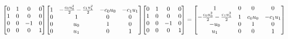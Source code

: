 \documentclass[11pt]{article}
\theoremstyle{definition}
\begin{document}
\[
\scaletoalign{\textwidth}{{\left[\begin{matrix}0 & 1 & 0 & 0\\1 & 0 & 0 & 0\\0 & 0 & -1 & 0\\0 & 0 & 0 & 1\end{matrix}\right]} {\left[\begin{matrix}1 & - \frac{c_{0} u_{0}^{2}}{2} - \frac{c_{1} u_{1}^{2}}{2} & - c_{0} u_{0} & - c_{1} u_{1}\\0 & 1 & 0 & 0\\0 & u_{0} & 1 & 0\\0 & u_{1} & 0 & 1\end{matrix}\right]} {\left[\begin{matrix}0 & 1 & 0 & 0\\1 & 0 & 0 & 0\\0 & 0 & -1 & 0\\0 & 0 & 0 & 1\end{matrix}\right]} = {\left[\begin{matrix}1 & 0 & 0 & 0\\- \frac{c_{0} u_{0}^{2}}{2} - \frac{c_{1} u_{1}^{2}}{2} & 1 & c_{0} u_{0} & - c_{1} u_{1}\\- u_{0} & 0 & 1 & 0\\u_{1} & 0 & 0 & 1\end{matrix}\right]}}
\]
\end{document}
